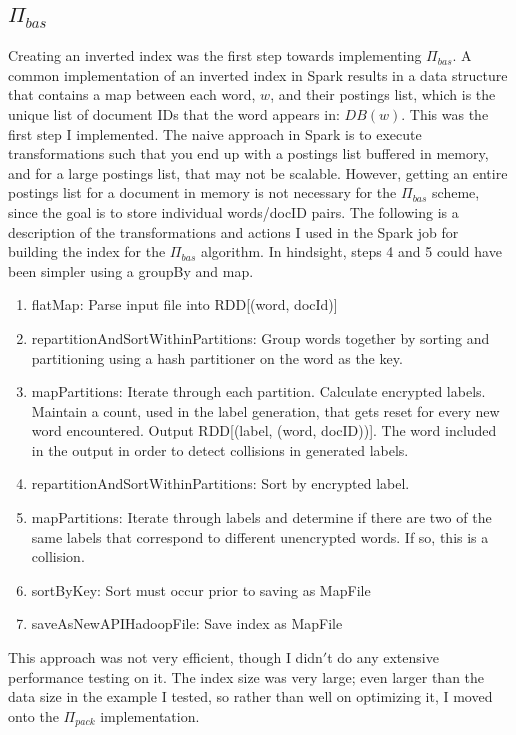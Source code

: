 \documentclass{sig-alternate-05-2015}
\begin{document}
\subsection{$\Pi_{bas}$}
Creating an inverted index was the first step towards implementing $\Pi_{bas}$. A common implementation of an inverted index in Spark results in a data structure that contains a map between each word, $w$, and their postings list, which is the unique list of document IDs that the word appears in: $DB(w)$. This was the first step I implemented. The naive approach in Spark is to execute transformations such that you end up with a postings list buffered in memory, and for a large postings list, that may not be scalable. However, getting an entire postings list for a document in memory is not necessary for the $\Pi_{bas}$ scheme, since the goal is to store individual words/docID pairs. The following is a description of the transformations and actions I used in the Spark job for building the index for the $\Pi_{bas}$ algorithm. In hindsight, steps 4 and 5 could have been simpler using a groupBy and map.

\begin{enumerate}
\item flatMap: Parse input file into RDD[(word, docId)]
\item repartitionAndSortWithinPartitions: Group words together by sorting and partitioning using a hash partitioner on the word as the key.
\item mapPartitions: Iterate through each partition. Calculate encrypted labels. Maintain a count, used in the label generation, that gets reset for every new word encountered. Output RDD[(label, (word, docID))]. The word included in the output in order to detect collisions in generated labels.
\item repartitionAndSortWithinPartitions: Sort by encrypted label.
\item mapPartitions: Iterate through labels and determine if there are two of the same labels that correspond to different unencrypted words. If so, this is a collision.
\item sortByKey: Sort must occur prior to saving as MapFile
\item saveAsNewAPIHadoopFile: Save index as MapFile
\end{enumerate}

This approach was not very efficient, though I didn$'$t do any extensive performance testing on it. The index size was very large; even larger than the data size in the example I tested, so rather than well on optimizing it, I moved onto the $\Pi_{pack}$ implementation.
\end{document}
